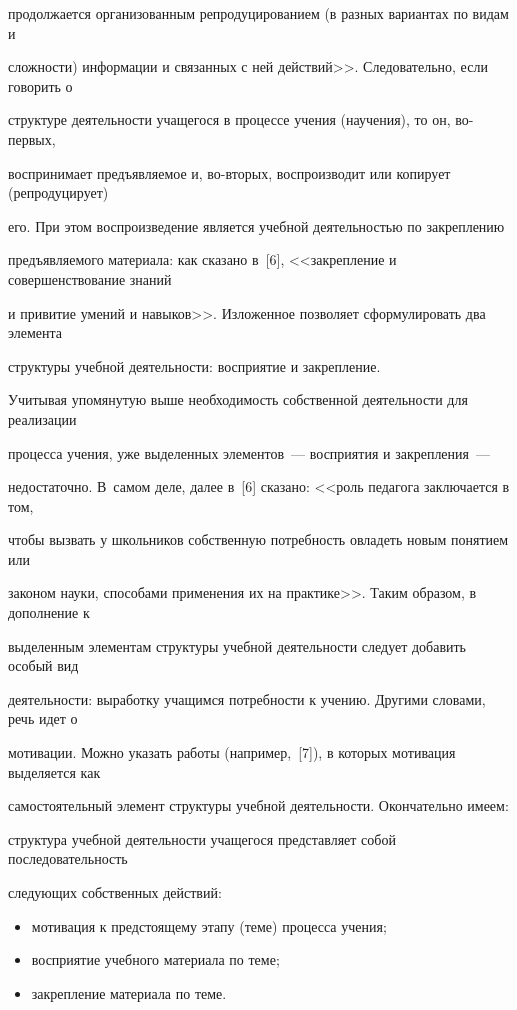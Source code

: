 продолжается организованным репродуцированием (в разных вариантах по видам и 


сложности) информации и связанных с ней действий>>. Следовательно, если говорить о 


структуре деятельности учащегося в процессе учения (научения), то он, во-пер\-вых, 


воспринимает предъявляемое и, во-вторых, воспроизводит или копирует (репродуцирует) 


его. При этом воспроизведение является учебной деятельностью по закреплению 


предъявляемого материала: как сказано в~[6], <<закрепление и совершенствование знаний 


и привитие умений и навыков>>. Изложенное позволяет сформулировать два элемента 


структуры учебной деятельности: восприятие и закрепление.





Учитывая упомянутую выше необходимость собственной деятельности для реализации 


процесса учения, уже выделенных элементов~--- восприятия и закрепления~--- 


недостаточно. В~самом деле, далее в~[6] сказано: <<роль педагога заключается в том, 


чтобы вызвать у школьников собственную потребность овладеть новым понятием или 


законом науки, способами применения их на практике>>. Таким образом, в дополнение к 


выделенным элементам структуры учебной деятельности следует добавить особый вид 


деятельности: выработку учащимся потребности к учению. Другими словами, речь идет о 


мотивации. Можно указать работы (например,~[7]), в которых мотивация выделяется как 


самостоятельный элемент структуры учебной деятельности. Окончательно имеем: 


структура учебной деятельности учащегося представляет собой последовательность 


следующих собственных действий:


\begin{itemize}


\item мотивация к предстоящему этапу (теме) процесса учения;\\[-15pt]


\item восприятие учебного материала по теме;\\[-15pt]


\item закрепление материала по теме.


\end{itemize}






